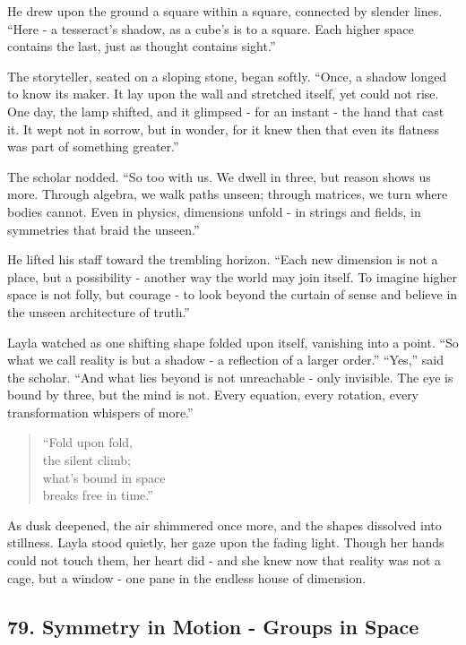 \documentclass[
  letterpaper,
  DIV=11,
  numbers=noendperiod]{scrreprt}
\begin{document}
He drew upon the ground a square within a square, connected by slender
lines. ``Here - a tesseract's shadow, as a cube's is to a square. Each
higher space contains the last, just as thought contains sight.''

The storyteller, seated on a sloping stone, began softly. ``Once, a
shadow longed to know its maker. It lay upon the wall and stretched
itself, yet could not rise. One day, the lamp shifted, and it glimpsed -
for an instant - the hand that cast it. It wept not in sorrow, but in
wonder, for it knew then that even its flatness was part of something
greater.''

The scholar nodded. ``So too with us. We dwell in three, but reason
shows us more. Through algebra, we walk paths unseen; through matrices,
we turn where bodies cannot. Even in physics, dimensions unfold - in
strings and fields, in symmetries that braid the unseen.''

He lifted his staff toward the trembling horizon. ``Each new dimension
is not a place, but a possibility - another way the world may join
itself. To imagine higher space is not folly, but courage - to look
beyond the curtain of sense and believe in the unseen architecture of
truth.''

Layla watched as one shifting shape folded upon itself, vanishing into a
point. ``So what we call reality is but a shadow - a reflection of a
larger order.'' ``Yes,'' said the scholar. ``And what lies beyond is not
unreachable - only invisible. The eye is bound by three, but the mind is
not. Every equation, every rotation, every transformation whispers of
more.''

\begin{quote}
``Fold upon fold,\\
the silent climb;\\
what's bound in space\\
breaks free in time.''
\end{quote}

As dusk deepened, the air shimmered once more, and the shapes dissolved
into stillness. Layla stood quietly, her gaze upon the fading light.
Though her hands could not touch them, her heart did - and she knew now
that reality was not a cage, but a window - one pane in the endless
house of dimension.

\subsection{79. Symmetry in Motion - Groups in
Space}\label{symmetry-in-motion---groups-in-space}
\end{document}
